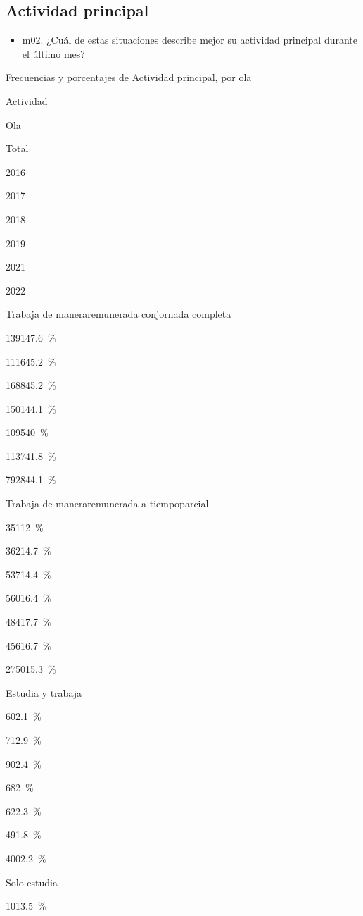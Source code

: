 \documentclass[
  12pt,
]{book}
\providecommand{\tightlist}{%
  \setlength{\itemsep}{0pt}\setlength{\parskip}{0pt}}
\begin{document}
\hypertarget{actividad-principal}{%
\subsection{Actividad principal}\label{actividad-principal}}

\begin{itemize}
\tightlist
\item
  m02. ¿Cuál de estas situaciones describe mejor su actividad principal durante el último mes?
\end{itemize}

Frecuencias y porcentajes de Actividad principal, por ola

Actividad

Ola

Total

2016

2017

2018

2019

2021

2022

Trabaja de maneraremunerada conjornada completa

{1391}{47.6~\%}

{1116}{45.2~\%}

{1688}{45.2~\%}

{1501}{44.1~\%}

{1095}{40~\%}

{1137}{41.8~\%}

{7928}{44.1~\%}

Trabaja de maneraremunerada a tiempoparcial

{351}{12~\%}

{362}{14.7~\%}

{537}{14.4~\%}

{560}{16.4~\%}

{484}{17.7~\%}

{456}{16.7~\%}

{2750}{15.3~\%}

Estudia y trabaja

{60}{2.1~\%}

{71}{2.9~\%}

{90}{2.4~\%}

{68}{2~\%}

{62}{2.3~\%}

{49}{1.8~\%}

{400}{2.2~\%}

Solo estudia

{101}{3.5~\%}
\end{document}
